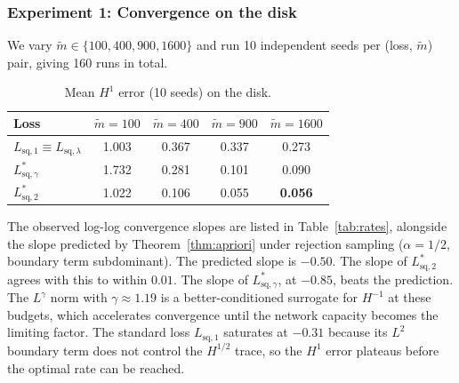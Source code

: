 \documentclass[11pt]{article}
\newcommand{\mtil}{\widetilde{m}}
\begin{document}
\subsubsection{Experiment 1: Convergence on the disk}
\label{sec:exp1}

We vary $\mtil \in \{100,400,900,1600\}$ and run 10 independent
seeds per (loss, $\mtil$) pair, giving 160 runs in total.

\begin{table}[h]
  \centering
  \caption{Mean $H^1$ error (10 seeds) on the disk.}
  \label{tab:exp1}
  \begin{tabular}{lcccc}
    \toprule
    Loss & $\mtil=100$ & $\mtil=400$ & $\mtil=900$ & $\mtil=1600$ \\
    \midrule
    $L_{\mathrm{sq},1} \equiv L_{\mathrm{sq},\lambda}$
      & 1.003 & 0.367 & 0.337 & 0.273 \\
    $L^*_{\mathrm{sq},\gamma}$
      & 1.732 & 0.281 & 0.101 & 0.090 \\
    $L^*_{\mathrm{sq},2}$
      & 1.022 & 0.106 & 0.055 & \textbf{0.056} \\
    \bottomrule
  \end{tabular}
\end{table}

The observed log-log convergence slopes are listed in
Table~\ref{tab:rates}, alongside the slope predicted by
Theorem~\ref{thm:apriori} under rejection sampling
($\alpha=1/2$, boundary term subdominant). The predicted slope is
$-0.50$. The slope of $L^*_{\mathrm{sq},2}$ agrees with this to
within $0.01$. The slope of $L^*_{\mathrm{sq},\gamma}$, at $-0.85$,
beats the prediction. The $L^\gamma$ norm with $\gamma\approx 1.19$
is a better-conditioned surrogate for $H^{-1}$ at these budgets,
which accelerates convergence until the network capacity becomes
the limiting factor. The standard loss $L_{\mathrm{sq},1}$ saturates
at $-0.31$ because its $L^2$ boundary term does not control the
$H^{1/2}$ trace, so the $H^1$ error plateaus before the optimal
rate can be reached.
\end{document}
